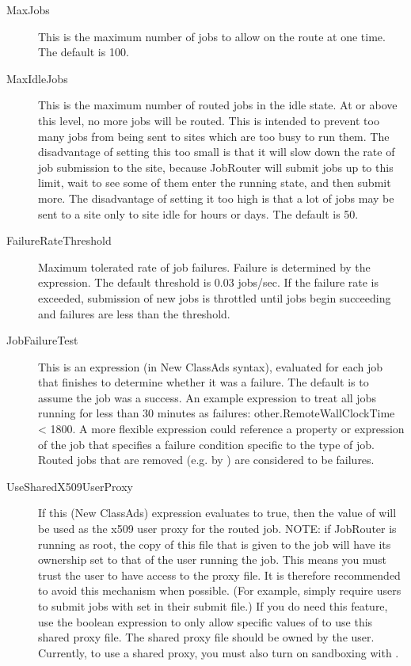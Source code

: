 \begin{description}
\begin{description}
\item[MaxJobs] This is the maximum number of jobs to allow on the route at
one time. The default is 100.

\item[MaxIdleJobs] This is the maximum number of routed jobs in the
idle state.  At or above this level, no more jobs will be routed.
This is intended to prevent too many jobs from being sent to sites
which are too busy to run them.  The disadvantage of setting this too
small is that it will slow down the rate of job submission to the
site, because JobRouter will submit jobs up to this limit, wait to see
some of them enter the running state, and then submit more.  The
disadvantage of setting it too high is that a lot of jobs may be sent
to a site only to site idle for hours or days.  The default is 50.

\item[FailureRateThreshold] Maximum tolerated rate of job failures.
Failure is determined by the  expression.  The
default threshold is 0.03 jobs/sec.  If the failure rate is exceeded,
submission of new jobs is throttled until jobs begin succeeding and
failures are less than the threshold.

\item[JobFailureTest] This is an expression (in New ClassAds syntax),
evaluated for each job that finishes to determine whether it was a
failure.  The default is to assume the job was a success.  An example
expression to treat all jobs running for less than 30 minutes as
failures: other.RemoteWallClockTime < 1800.  A more flexible
expression could reference a property or expression of the job that
specifies a failure condition specific to the type of job.  Routed
jobs that are removed (e.g. by ) are considered
to be failures.

\item[UseSharedX509UserProxy] If this (New ClassAds) expression
evaluates to true, then the value of  will
be used as the x509 user proxy for the routed job.  NOTE: if JobRouter
is running as root, the copy of this file that is given to the job
will have its ownership set to that of the user running the job.  This
means you must trust the user to have access to the proxy file.  It is
therefore recommended to avoid this mechanism when possible.  (For
example, simply require users to submit jobs with 
set in their submit file.)  If you do need this feature, use the
boolean expression to only allow specific values of 
to use this shared proxy file.  The shared proxy file should be owned
by the  user.  Currently, to use a shared proxy, you must also
turn on sandboxing with .


\end{description}
\end{description}
